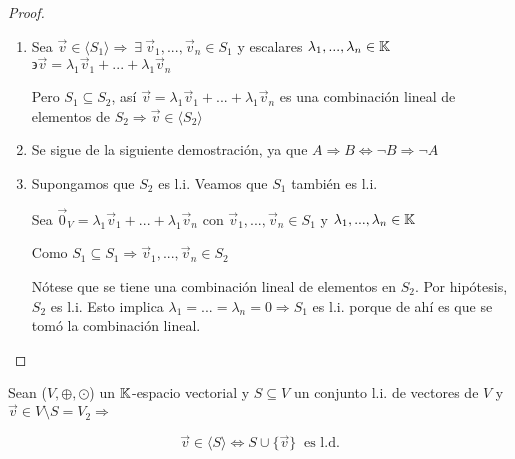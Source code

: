 \begin{proof}
    \begin{enumerate}
    \item Sea $\vec{v} \in \langle  S_1 \rangle \Rightarrow \: \exists \: {\vec{v}}_{1}, ..., {\vec{v}}_{n} \in S_1$ y escalares $\lambda_1,...,\lambda_n \in \mathbb{K} $ $\backepsilon \vec{v} = {\lambda}_{1}{\vec{v}}_{1} + ...+ {\lambda}_{1} {\vec{v}}_{n}$

    Pero $S_1 \subseteq S_2$, así $\vec{v} = {\lambda}_{1}{\vec{v}}_{1} + ...+ {\lambda}_{1} {\vec{v}}_{n}$ es una combinación lineal de elementos de $S_2 \Rightarrow \vec{v} \in  \langle  S_2 \rangle$

    \item Se sigue de la siguiente demostración, ya que $A \Rightarrow B \iff \neg B \Rightarrow \neg A$

    \item Supongamos que $S_2$ es l.i. Veamos que $S_1$ también es l.i.

    Sea ${\vec{0}}_{V} =  {\lambda}_{1}{\vec{v}}_{1} + ...+ {\lambda}_{1} {\vec{v}}_{n}$ con ${\vec{v}}_{1}, ..., {\vec{v}}_{n} \in S_1$ y $\lambda_1 , ..., \lambda_n \in \mathbb{K}$

    Como $S_1 \subseteq S_1 \Rightarrow {\vec{v}}_{1}, ..., {\vec{v}}_{n} \in S_2$

    Nótese que se tiene una combinación lineal de elementos en $S_2$. Por hipótesis, $S_2$ es l.i. Esto implica $\lambda_1 = ...= \lambda_n = 0 \Rightarrow S_1$ es l.i. porque de ahí es que se tomó la combinación lineal.

    
    \end{enumerate}
\end{proof}

\begin{theorem} \label{fakelema}
     Sean ($V, \oplus, \odot$) un $\mathbb{K}$-espacio vectorial y $S \subseteq V$ un conjunto l.i. de vectores de $V$ y $ \vec{v} \in V \setminus S = V_2 \Rightarrow$

     \begin{equation*}
         \vec{v} \in \langle S \rangle \iff S \cup \{ \vec{v} \} \: \text{ es l.d.}
     \end{equation*}
\end{theorem}

